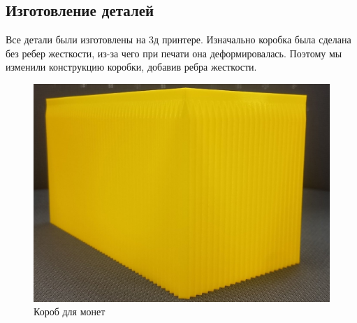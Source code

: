 \subsection{Изготовление деталей}

Все детали были изготовлены на 3д принтере. Изначально коробка была сделана без ребер жесткости, из-за чего при печати она деформировалась. 
Поэтому мы изменили конструкцию коробки, добавив ребра жесткости. 

\begin{figure}[H]
	\centering
	\includegraphics[width=12cm]{korob.jpg}
	\caption{Короб для монет}
	\label{ris:korob_done}
\end{figure}
\par\medskip